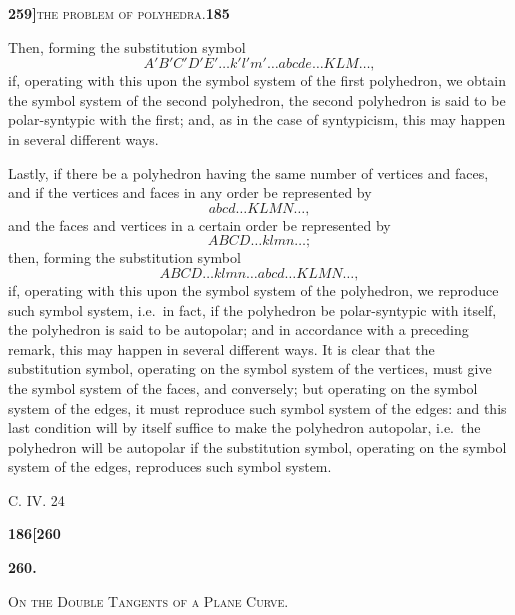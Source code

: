 \documentclass[11pt]{article}
\begin{document}
\newpage

\noindent\textbf{259]}\hfill\textsc{the problem of polyhedra.}\hfill\textbf{185}

\medskip

\noindent Then, forming the substitution symbol
\[
A'B'C'D'E'\ldots k'l'm'\ldots abcde\ldots KLM\ldots,
\]
if, operating with this upon the symbol system of the first polyhedron, we obtain the symbol system of the second polyhedron, the second polyhedron is said to be polar-syntypic with the first; and, as in the case of syntypicism, this may happen in several different ways.

Lastly, if there be a polyhedron having the same number of vertices and faces, and if the vertices and faces in any order be represented by
\[
abcd\ldots KLMN\ldots,
\]
and the faces and vertices in a certain order be represented by
\[
ABCD\ldots klmn\ldots;
\]
then, forming the substitution symbol
\[
ABCD\ldots klmn\ldots abcd\ldots KLMN\ldots,
\]
if, operating with this upon the symbol system of the polyhedron, we reproduce such symbol system, i.e.\ in fact, if the polyhedron be polar-syntypic with itself, the polyhedron is said to be autopolar; and in accordance with a preceding remark, this may happen in several different ways. It is clear that the substitution symbol, operating on the symbol system of the vertices, must give the symbol system of the faces, and conversely; but operating on the symbol system of the edges, it must reproduce such symbol system of the edges: and this last condition will by itself suffice to make the polyhedron autopolar, i.e.\ the polyhedron will be autopolar if the substitution symbol, operating on the symbol system of the edges, reproduces such symbol system.

\bigskip

\noindent\hfill C. IV. \hfill 24

\newpage


\noindent\textbf{186}\hfill\textbf{[260}

\bigskip

\begin{center}
{\large\bfseries 260.}

\medskip

{\scshape On the Double Tangents of a Plane Curve.}
\end{center}
\end{document}
